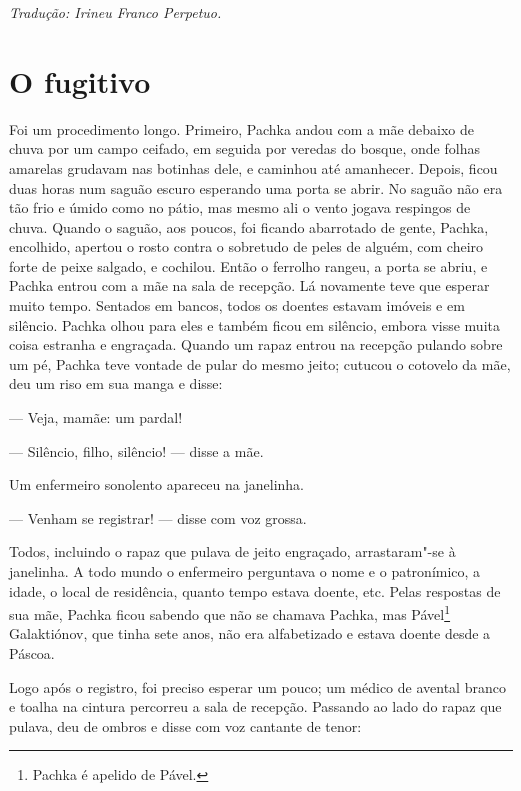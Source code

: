 
\medskip

{\footnotesize\hfill\emph{Tradução: Irineu Franco Perpetuo.}}

\chapter{O fugitivo}\label{part7}

Foi um procedimento longo. Primeiro, Pachka andou com a mãe debaixo de
chuva por um campo ceifado, em seguida por veredas do bosque, onde
folhas amarelas grudavam nas botinhas dele, e caminhou até amanhecer.
Depois, ficou duas horas num saguão escuro esperando uma porta se abrir.
No saguão não era tão frio e úmido como no pátio, mas mesmo ali o vento
jogava respingos de chuva. Quando o saguão, aos poucos, foi ficando
abarrotado de gente, Pachka, encolhido, apertou o rosto contra o
sobretudo de peles de alguém, com cheiro forte de peixe salgado, e
cochilou. Então o ferrolho rangeu, a porta se abriu, e Pachka entrou com
a mãe na sala de recepção. Lá novamente teve que esperar muito tempo.
Sentados em bancos, todos os doentes estavam imóveis e em silêncio.
Pachka olhou para eles e também ficou em silêncio, embora visse muita
coisa estranha e engraçada. Quando um rapaz entrou na recepção pulando
sobre um pé, Pachka teve vontade de pular do mesmo jeito; cutucou o
cotovelo da mãe, deu um riso em sua manga e disse:

--- Veja, mamãe: um pardal!

--- Silêncio, filho, silêncio! --- disse a mãe.

Um enfermeiro sonolento apareceu na janelinha.

--- Venham se registrar! --- disse com voz grossa.

Todos, incluindo o rapaz que pulava de jeito engraçado, arrastaram"-se à
janelinha. A todo mundo o enfermeiro perguntava o nome e o patronímico,
a idade, o local de residência, quanto tempo estava doente, etc. Pelas
respostas de sua mãe, Pachka ficou sabendo que não se chamava Pachka,
mas Pável\footnote{Pachka é apelido de Pável.} Galaktiónov, que tinha
sete anos, não era alfabetizado e estava doente desde a Páscoa.

Logo após o registro, foi preciso esperar um pouco; um médico de avental
branco e toalha na cintura percorreu a sala de recepção. Passando ao
lado do rapaz que pulava, deu de ombros e disse com voz cantante de
tenor:

